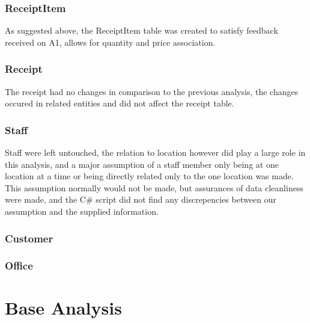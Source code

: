 \documentclass{article}
\begin{document}
            \subsubsection{ReceiptItem}
                As suggested above, the ReceiptItem table was created
                to satisfy feedback received on A1, allows for quantity 
                and price association.

            \subsubsection{Receipt}
                The receipt had no changes in comparison to the previous
                analysis, the changes occured in related entities 
                and did not affect the receipt table.

            \subsubsection{Staff}
                Staff were left untouched, the relation to location 
                however did play a large role in this analysis, and 
                a major assumption of a staff member only being at one 
                location at a time or being directly related only to
                the one location was made.
                \\
                This assumption normally would not be made, but 
                assurances of data cleanliness were made, and the C\#
                script did not find any discrepencies between our assumption and the supplied information.

            \subsubsection{Customer}

            \subsubsection{Office}

    \section{Base Analysis}
    \label{sec:BA}
\end{document}
